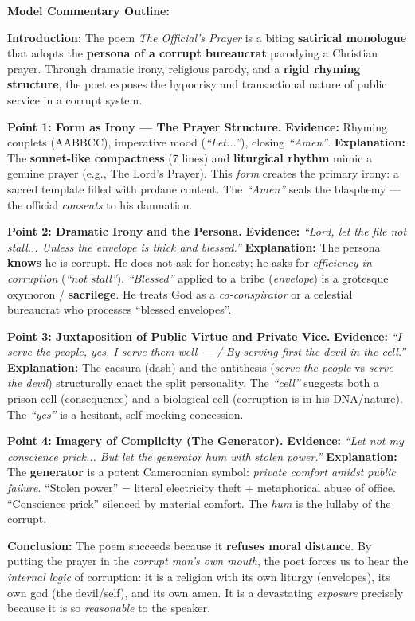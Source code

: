 \documentclass[11pt]{article}
\newcommand{\cle}[1]{{\popxbold\color{popdark}#1}}
\begin{document}
\begin{corrige}
\textbf{Model Commentary Outline:}

\textbf{Introduction:} The poem \emph{The Official's Prayer} is a biting \textbf{satirical monologue} that adopts the \textbf{persona of a corrupt bureaucrat} parodying a Christian prayer. Through \cle{dramatic irony}, \cle{religious parody}, and a \textbf{rigid rhyming structure}, the poet exposes the hypocrisy and transactional nature of public service in a corrupt system.

\textbf{Point 1: Form as Irony — The Prayer Structure.}
\textbf{Evidence:} Rhyming couplets (AABBCC), imperative mood (\emph{``Let...''}), closing \emph{``Amen''}.
\textbf{Explanation:} The \textbf{sonnet-like compactness} (7 lines) and \textbf{liturgical rhythm} mimic a genuine prayer (e.g., The Lord's Prayer). This \emph{form} creates the primary irony: a sacred template filled with profane content. The \emph{``Amen''} seals the blasphemy — the official \emph{consents} to his damnation.

\textbf{Point 2: Dramatic Irony and the Persona.}
\textbf{Evidence:} \emph{``Lord, let the file not stall... Unless the envelope is thick and blessed.''}
\textbf{Explanation:} The persona \textbf{knows} he is corrupt. He does not ask for honesty; he asks for \emph{efficiency in corruption} (\emph{``not stall''}). \emph{``Blessed''} applied to a bribe (\emph{envelope}) is a grotesque \cle{oxymoron} / \textbf{sacrilege}. He treats God as a \emph{co-conspirator} or a celestial bureaucrat who processes ``blessed envelopes''.

\textbf{Point 3: Juxtaposition of Public Virtue and Private Vice.}
\textbf{Evidence:} \emph{``I serve the people, yes, I serve them well — / By serving first the devil in the cell.''}
\textbf{Explanation:} The \cle{caesura} (dash) and the \cle{antithesis} (\emph{serve the people} vs \emph{serve the devil}) structurally enact the split personality. The \emph{``cell''} suggests both a prison cell (consequence) and a biological cell (corruption is in his DNA/nature). The \emph{``yes''} is a hesitant, self-mocking concession.

\textbf{Point 4: Imagery of Complicity (The Generator).}
\textbf{Evidence:} \emph{``Let not my conscience prick... But let the generator hum with stolen power.''}
\textbf{Explanation:} The \textbf{generator} is a potent Cameroonian symbol: \emph{private comfort amidst public failure}. ``Stolen power'' = literal electricity theft + metaphorical abuse of office. ``Conscience prick'' silenced by material comfort. The \emph{hum} is the lullaby of the corrupt.

\textbf{Conclusion:} The poem succeeds because it \textbf{refuses moral distance}. By putting the prayer in the \emph{corrupt man's own mouth}, the poet forces us to hear the \emph{internal logic} of corruption: it is a religion with its own liturgy (envelopes), its own god (the devil/self), and its own amen. It is a devastating \emph{exposure} precisely because it is so \emph{reasonable} to the speaker.
\end{corrige}
\end{document}

